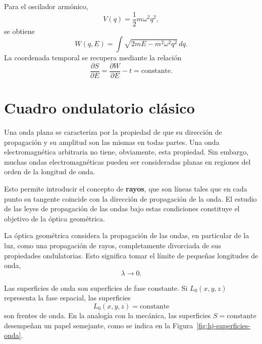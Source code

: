 \documentclass[../apunte_mecanica_clasica.tex]{subfiles}%
\begin{document}
Para el oscilador armónico,
\begin{equation}
    V(q)=\frac{1}{2}m\omega^2q^2,
    \label{eq:hj-potencial-oscilador}
\end{equation}
se obtiene
\begin{equation}
    W(q,E)=\int \sqrt{2mE-m^2\omega^2q^2}\,dq.
    \label{eq:hj-w-oscilador}
\end{equation}
La coordenada temporal se recupera mediante la relación
\begin{equation}
    \frac{\partial S}{\partial E}=\frac{\partial W}{\partial E}-t=\text{constante}.
    \label{eq:hj-tiempo-desde-w}
\end{equation}

\section{Cuadro ondulatorio clásico}
\label{sec:hj-cuadro-ondulatorio-clasico}

Una onda plana se caracteriza por la propiedad de que su dirección de propagación y su amplitud son las mismas en todas partes. Una onda electromagnética arbitraria no tiene, obviamente, esta propiedad. Sin embargo, muchas ondas electromagnéticas pueden ser consideradas planas en regiones del orden de la longitud de onda.

Esto permite introducir el concepto de \textbf{rayos}, que son líneas tales que en cada punto su tangente coincide con la dirección de propagación de la onda. El estudio de las leyes de propagación de las ondas bajo estas condiciones constituye el objetivo de la óptica geométrica.

La óptica geométrica considera la propagación de las ondas, en particular de la luz, como una propagación de rayos, completamente divorciada de sus propiedades ondulatorias. Esto significa tomar el límite de pequeñas longitudes de onda,
\begin{equation}
    \lambda\rightarrow 0.
    \label{eq:hj-limite-longitud-onda}
\end{equation}

Las superficies de onda son superficies de fase constante. Si $L_0(x,y,z)$ representa la fase espacial, las superficies
\begin{equation}
    L_0(x,y,z)=\text{constante}
    \label{eq:hj-superficies-fase}
\end{equation}
son frentes de onda. En la analogía con la mecánica, las superficies $S=\text{constante}$ desempeñan un papel semejante, como se indica en la Figura~\ref{fig:hj-superficies-onda}.
\end{document}
